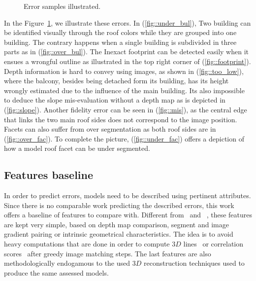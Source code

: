 \documentclass[runningheads]{llncs}
\newcounter{SubFigCounter}
\begin{document}
\begin{figure}[H]
\begin{center}
{{                    \label{fig::fac_err}
                    \addtocounter{figure}{-1}
                }
            }
            {
                \caption{\label{fig::samples}Error samples illustrated.}
            }
        \end{center}
    \end{figure}

    In the Figure~\ref{fig::samples}, we illustrate these errors. In (\ref{fig::under_bul}), Two building can be identified visually through the roof colors while they are grouped into one building. The contrary happens when a single building is subdivided in three parts as in (\ref{fig::over_bul}). The Inexact footprint can be detected easily when it ensues a wrongful outline as illustrated in the top right corner of (\ref{fig::footprint}). Depth information is hard to convey using images, as shown in (\ref{fig::too_low}), where the balcony, besides being detached form its building, has its height wrongly estimated due to the influence of the main building. Its also impossible to deduce the slope mis-evaluation without a depth map as is depicted in (\ref{fig::slope}). Another fidelity error can be seen in (\ref{fig::mis}), as the central edge that links the two main roof sides does not correspond to the image position. Facets can also suffer from over segmentation as both roof sides are in (\ref{fig::over_fac}). To complete the picture, (\ref{fig::under_fac}) offers a depiction of how a model roof facet can be under segmented.

\subsection{Features baseline}
In order to predict errors, models need to be described using pertinent attributes. Since there is no comparable work predicting the described errors, this work offers a baseline of features to compare with. Different from~\cite{boudet2006supervised} and ~\cite{Michelin2013}, these features are kept very simple, based on depth map comparison, segment and image gradient pairing or intrinsic geometrical characteristics. The idea is to avoid heavy computations that are done in order to compute $3D$ lines~\cite{Michelin2013} or correlation scores~\cite{boudet2006supervised} after greedy image matching steps. The last features are also methodologically endogamous to the used $3D$ reconstruction techniques used to produce the same assessed models.
\end{document}
